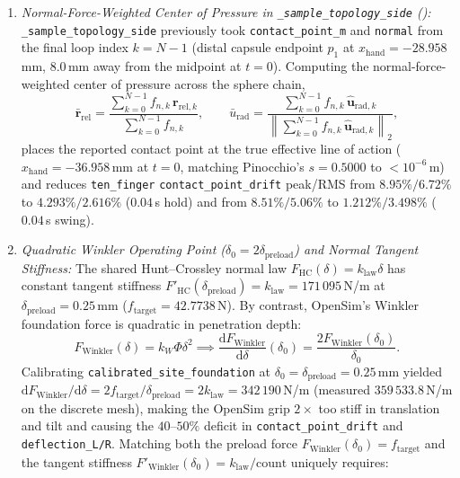 \documentclass[11pt,a4paper]{article}
\begin{document}
\begin{enumerate}[leftmargin=*,noitemsep]
\item \textit{Normal-Force-Weighted Center of Pressure in \texttt{\_sample\_topology\_side} ():} \texttt{\_sample\_topology\_side} previously took \texttt{contact\_point\_m} and \texttt{normal} from the final loop index $k = N - 1$ (distal capsule endpoint $p_1$ at $x_{\mathrm{hand}} = -28.958$\,mm, $8.0$\,mm away from the midpoint at $t = 0$). Computing the normal-force-weighted center of pressure across the sphere chain,
\begin{equation}
\bar{\mathbf{r}}_{\mathrm{rel}} = \frac{\sum_{k=0}^{N-1} f_{n,k}\,\mathbf{r}_{\mathrm{rel},k}}{\sum_{k=0}^{N-1} f_{n,k}}, \qquad
\bar{u}_{\mathrm{rad}} = \frac{\sum_{k=0}^{N-1} f_{n,k}\,\hat{\mathbf{u}}_{\mathrm{rad},k}}{\left\|\sum_{k=0}^{N-1} f_{n,k}\,\hat{\mathbf{u}}_{\mathrm{rad},k}\right\|_2},
\end{equation}
places the reported contact point at the true effective line of action ($x_{\mathrm{hand}} = -36.958$\,mm at $t = 0$, matching Pinocchio's $s = 0.5000$ to $< 10^{-6}$\,m) and reduces \texttt{ten\_finger} \texttt{contact\_point\_drift} peak/RMS from $8.95\% / 6.72\%$ to $4.293\% / 2.616\%$ ($0.04$\,s hold) and from $8.51\% / 5.06\%$ to $1.212\% / 3.498\%$ ($0.04$\,s swing).
\item \textit{Quadratic Winkler Operating Point ($\delta_0 = 2\delta_{\mathrm{preload}}$) and Normal Tangent Stiffness:} The shared Hunt--Crossley normal law $F_{\mathrm{HC}}(\delta) = k_{\mathrm{law}}\delta$ has constant tangent stiffness $F'_{\mathrm{HC}}(\delta_{\mathrm{preload}}) = k_{\mathrm{law}} = 171\,095$\,N/m at $\delta_{\mathrm{preload}} = 0.25$\,mm ($f_{\mathrm{target}} = 42.7738$\,N). By contrast, OpenSim's Winkler foundation force is quadratic in penetration depth:
\begin{equation}
F_{\mathrm{Winkler}}(\delta) = k_W \Phi \delta^2 \implies \frac{\mathrm{d}F_{\mathrm{Winkler}}}{\mathrm{d}\delta}(\delta_0) = \frac{2 F_{\mathrm{Winkler}}(\delta_0)}{\delta_0}.
\end{equation}
Calibrating \texttt{calibrated\_site\_foundation} at $\delta_0 = \delta_{\mathrm{preload}} = 0.25$\,mm yielded $\mathrm{d}F_{\mathrm{Winkler}}/\mathrm{d}\delta = 2 f_{\mathrm{target}}/\delta_{\mathrm{preload}} = 2 k_{\mathrm{law}} = 342\,190$\,N/m (measured $359\,533.8$\,N/m on the discrete mesh), making the OpenSim grip $2\times$ too stiff in translation and tilt and causing the $40\text{--}50\%$ deficit in \texttt{contact\_point\_drift} and \texttt{deflection\_L/R}. Matching both the preload force $F_{\mathrm{Winkler}}(\delta_0) = f_{\mathrm{target}}$ and the tangent stiffness $F'_{\mathrm{Winkler}}(\delta_0) = k_{\mathrm{law}}/\mathrm{count}$ uniquely requires:

\end{enumerate}
\end{document}
